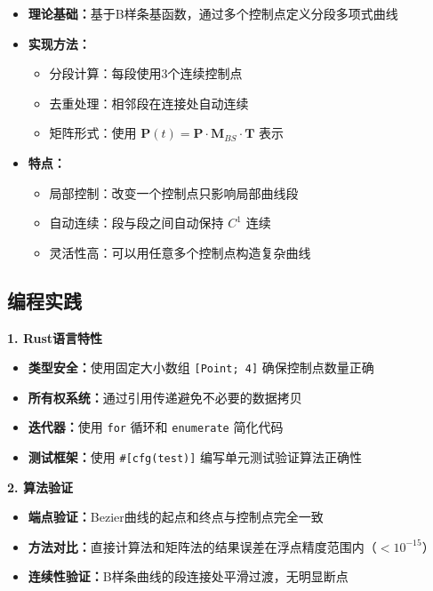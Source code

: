 \documentclass[12pt,a4paper]{article}
\begin{document}
\begin{tcolorbox}[breakable]
\begin{itemize}
\item \textbf{理论基础：}基于B样条基函数，通过多个控制点定义分段多项式曲线
\item \textbf{实现方法：}
  \begin{itemize}
  \item 分段计算：每段使用3个连续控制点
  \item 去重处理：相邻段在连接处自动连续
  \item 矩阵形式：使用 $\mathbf{P}(t) = \mathbf{P} \cdot \mathbf{M}_{BS} \cdot \mathbf{T}$ 表示
  \end{itemize}
\item \textbf{特点：}
  \begin{itemize}
  \item 局部控制：改变一个控制点只影响局部曲线段
  \item 自动连续：段与段之间自动保持 $C^1$ 连续
  \item 灵活性高：可以用任意多个控制点构造复杂曲线
  \end{itemize}
\end{itemize}

\subsection{编程实践}

\textbf{1. Rust语言特性}

\begin{itemize}
\item \textbf{类型安全：}使用固定大小数组 \texttt{[Point; 4]} 确保控制点数量正确
\item \textbf{所有权系统：}通过引用传递避免不必要的数据拷贝
\item \textbf{迭代器：}使用 \texttt{for} 循环和 \texttt{enumerate} 简化代码
\item \textbf{测试框架：}使用 \texttt{\#[cfg(test)]} 编写单元测试验证算法正确性
\end{itemize}

\textbf{2. 算法验证}

\begin{itemize}
\item \textbf{端点验证：}Bezier曲线的起点和终点与控制点完全一致
\item \textbf{方法对比：}直接计算法和矩阵法的结果误差在浮点精度范围内（$< 10^{-15}$）
\item \textbf{连续性验证：}B样条曲线的段连接处平滑过渡，无明显断点
\end{itemize}


\end{tcolorbox}
\end{document}
